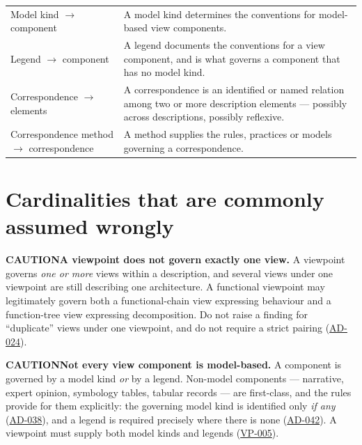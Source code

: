 \documentclass[11pt,a4paper]{report}
\newcommand{\calloutlead}[2]{{\sffamily\bfseries\footnotesize\color{#1}#2\quad}}
\newcommand{\risknote}[1]{\begin{riskbox}\calloutlead{brick}{CAUTION}#1\end{riskbox}}
\newcommand{\rref}[1]{\hyperref[rule:#1]{\textsf{\small #1}}}
\begin{document}
\begin{center}
\begin{longtable}{@{}L{44mm} L{92mm}@{}}
Model kind $\rightarrow$ component
  & A model kind determines the conventions for model-based view components. \\
Legend $\rightarrow$ component
  & A legend documents the conventions for a view component, and is what governs
    a component that has no model kind. \\
Correspondence $\rightarrow$ elements
  & A correspondence is an identified or named relation among two or more
    description elements --- possibly across descriptions, possibly reflexive. \\
Correspondence method $\rightarrow$ correspondence
  & A method supplies the rules, practices or models governing a correspondence. \\
\bottomrule
\end{longtable}
\end{center}

\section{Cardinalities that are commonly assumed wrongly}

\risknote{\textbf{A viewpoint does not govern exactly one view.} A viewpoint
governs \emph{one or more} views within a description, and several views under
one viewpoint are still describing one architecture. A functional viewpoint may
legitimately govern both a functional-chain view expressing behaviour and a
function-tree view expressing decomposition. Do not raise a finding for
``duplicate'' views under one viewpoint, and do not require a strict pairing
(\rref{AD-024}).}

\risknote{\textbf{Not every view component is model-based.} A component is
governed by a model kind \emph{or} by a legend. Non-model components ---
narrative, expert opinion, symbology tables, tabular records --- are
first-class, and the rules provide for them explicitly: the governing model kind
is identified only \emph{if any} (\rref{AD-038}), and a legend is
required precisely where there is none (\rref{AD-042}). A
viewpoint must supply both model kinds and legends
(\rref{VP-005}).}
\end{document}
